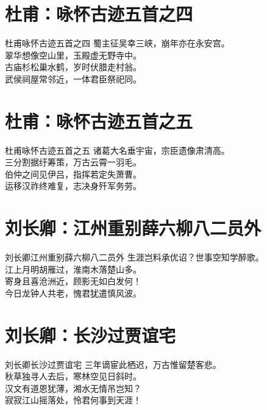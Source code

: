 \documentclass[12pt,oneside,a5paper]{book}
\begin{document}
\chapter{杜甫：咏怀古迹五首之四}
\begin{poemzh}{杜甫}{咏怀古迹五首之四}
蜀主征吴幸三峡，崩年亦在永安宫。\\
翠华想像空山里，玉殿虚无野寺中。\\
古庙杉松巢水鹤，岁时伏腊走村翁。\\
武侯祠屋常邻近，一体君臣祭祀同。\\ 
\end{poemzh}

\chapter{杜甫：咏怀古迹五首之五}
\begin{poemzh}{杜甫}{咏怀古迹五首之五}
诸葛大名垂宇宙，宗臣遗像肃清高。\\
三分割据纡筹策，万古云霄一羽毛。\\
伯仲之间见伊吕，指挥若定失萧曹。\\
运移汉祚终难复，志决身歼军务劳。\\ 
\end{poemzh}

\chapter{刘长卿：江州重别薛六柳八二员外}
\begin{poemzh}{刘长卿}{江州重别薛六柳八二员外}
生涯岂料承优诏？世事空知学醉歌。\\
江上月明胡雁过，淮南木落楚山多。\\
寄身且喜沧洲近，顾影无如白发何！\\
今日龙钟人共老，愧君犹遣慎风波。\\ 
\end{poemzh}

\chapter{刘长卿：长沙过贾谊宅}
\begin{poemzh}{刘长卿}{长沙过贾谊宅}
三年谪宦此栖迟，万古惟留楚客悲。\\
秋草独寻人去后，寒林空见日斜时。\\
汉文有道恩犹薄，湘水无情吊岂知？\\
寂寂江山摇落处，怜君何事到天涯！\\ 
\end{poemzh}
\end{document}
